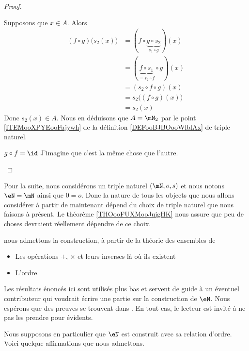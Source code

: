 \begin{proof}
\begin{subproof}
        Supposons que \( x\in A\). Alors
        \begin{subequations}
            \begin{align}
                (f\circ g)\big( s_2(x) \big)&=(f\circ \underbrace{g\circ s_2}_{s_1\circ g})(x)\\
                &=(\underbrace{f\circ s_1}_{=s_2\circ f}\circ g)(x)\\
                &=(s_2\circ f\circ g)(x)\\
                &=s_2\big( (f\circ g)(x) \big)\\
                &=s_2(x)
            \end{align}
        \end{subequations}
        Donc \( s_2(x)\in A\). Nous en déduisons que \( A=\mN_2\) par le point \ref{ITEMooXPYEooFajywh} de la définition \ref{DEFooBJBOooWlblAx} de triple naturel.
    \item[\( g\circ f=\id\)]
        J'imagine que c'est la même chose que l'autre.
    \end{subproof}
\end{proof}

\begin{normaltext}[Définition de \( \eN\)]
Pour la suite, nous considérons un triple naturel \( (\mN,o,s)\) et nous notons \( \eN=\mN\) ainsi que \( 0=o\). Donc la nature de tous les objects que nous allons considérer à partir de maintenant dépend du choix de triple naturel que nous faisons à présent. Le théorème \ref{THOooFUXMooJuigHK} nous assure que peu de choses devraient réellement dépendre de ce choix.
\end{normaltext}


nous admettons la construction, à partir de la théorie des ensembles de
\begin{itemize}
    \item Les opérations \( +\), \( \times\) et leurs inverses là où ils existent
    \item L'ordre.
\end{itemize}

Les résultats énoncés ici sont utilisés plus bas et servent de guide à un éventuel contributeur qui voudrait écrire une partie sur la construction de \( \eN\). Nous espérons que des preuves se trouvent dans \cite{RWWJooJdjxEK}. En tout cas, le lecteur est invité à ne pas les prendre pour évidents.

Nous supposons en particulier que \( \eN\) est construit avec sa relation d'ordre. Voici quelque affirmations que nous admettons.

